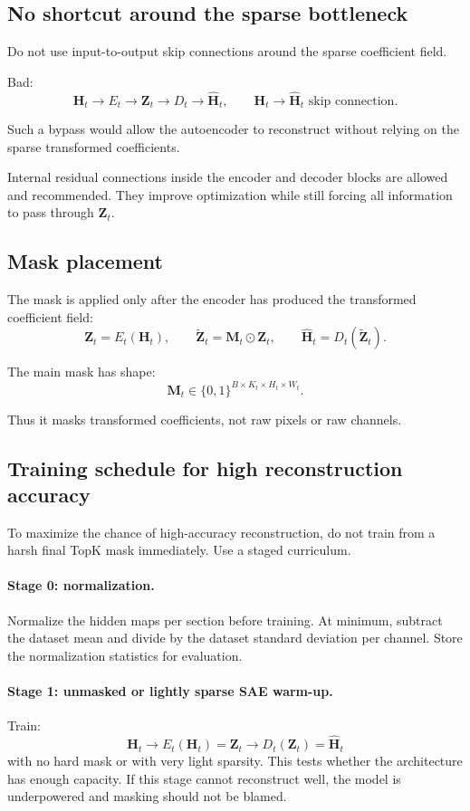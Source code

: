 \documentclass[11pt]{article}
\newcommand{\Htens}{\mathbf{H}}
\newcommand{\Ztens}{\mathbf{Z}}
\newcommand{\Mtens}{\mathbf{M}}
\newcommand{\Hhat}{\widehat{\mathbf{H}}}
\newcommand{\Ztilde}{\widetilde{\mathbf{Z}}}
\begin{document}
\subsection{No shortcut around the sparse bottleneck}

Do not use input-to-output skip connections around the sparse coefficient field.

Bad:
\[
\Htens_t
\rightarrow
E_t
\rightarrow
\Ztens_t
\rightarrow
D_t
\rightarrow
\Hhat_t,
\qquad
\Htens_t \rightarrow \Hhat_t \text{ skip connection}.
\]

Such a bypass would allow the autoencoder to reconstruct without relying on the sparse transformed coefficients.

Internal residual connections inside the encoder and decoder blocks are allowed and recommended. They improve optimization while still forcing all information to pass through \(\Ztens_t\).

\subsection{Mask placement}

The mask is applied only after the encoder has produced the transformed coefficient field:
\[
\Ztens_t = E_t(\Htens_t),
\qquad
\Ztilde_t = \Mtens_t \odot \Ztens_t,
\qquad
\Hhat_t = D_t(\Ztilde_t).
\]

The main mask has shape:
\[
\Mtens_t \in \{0,1\}^{B \times K_t \times H_t \times W_t}.
\]

Thus it masks transformed coefficients, not raw pixels or raw channels.

\subsection{Training schedule for high reconstruction accuracy}

To maximize the chance of high-accuracy reconstruction, do not train from a harsh final TopK mask immediately. Use a staged curriculum.

\paragraph{Stage 0: normalization.}
Normalize the hidden maps per section before training. At minimum, subtract the dataset mean and divide by the dataset standard deviation per channel. Store the normalization statistics for evaluation.

\paragraph{Stage 1: unmasked or lightly sparse SAE warm-up.}
Train:
\[
\Htens_t \rightarrow E_t(\Htens_t)=\Ztens_t \rightarrow D_t(\Ztens_t)=\Hhat_t
\]
with no hard mask or with very light sparsity. This tests whether the architecture has enough capacity. If this stage cannot reconstruct well, the model is underpowered and masking should not be blamed.
\end{document}
